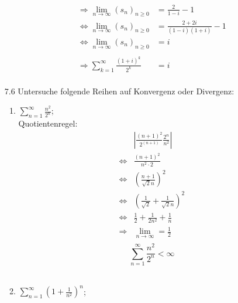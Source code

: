\documentclass{HM}
\begin{document}
\begin{enumerate}
\begin{enumerate}
\begin{align*}
	\Rightarrow \lim_{n\to\infty}(s_n)_{n\ge0} &= \frac{2}{1-i}-1\\
	\Leftrightarrow \lim_{n\to\infty}(s_n)_{n\ge0} &= \frac{2+2i}{(1-i)(1+i)}-1\\
	\Leftrightarrow \lim_{n\to\infty}(s_n)_{n\ge0} &= i\\	
	\\
	\Rightarrow \sum\limits_{k=1}^\infty\frac{(1+i)^k}{2^k} &= i\\
\end{align*}
\end{enumerate}
\item[7.6] Untersuche folgende Reihen auf Konvergenz oder Divergenz:
\begin{enumerate}
\item $\sum\limits_{n=1}^\infty\frac{n^2}{2^n}$;\\
Quotientenregel:
\begin{align*}
	&\left|\frac{(n+1)^2}{2^(n+1)}\frac{2^n}{n^2}\right|\\
	\Leftrightarrow &\frac{(n+1)^2}{n^2\cdot 2}\\
	\Leftrightarrow &\left(\frac{n+1}{\sqrt{2}n}\right)^2\\
	\Leftrightarrow &\left(\frac{1}{\sqrt{2}}+\frac{1}{\sqrt{2}n}\right)^2\\
	\Leftrightarrow &\frac{1}{2} + \frac{1}{2n^2} + \frac{1}{n}\\
	\Rightarrow &\lim_{n\to\infty} = \frac{1}{2}\\
\end{align*}
$$\sum\limits_{n=1}^\infty\frac{n^2}{2^n} < \infty$$\\

\item $\sum\limits_{n=1}^\infty(1+\frac{1}{n^2})^n$;\\


\end{enumerate}
\end{enumerate}
\end{document}
